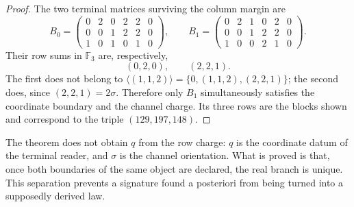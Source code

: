 \begin{proof}
The two terminal matrices surviving the column margin are
\[
B_0=
\begin{pmatrix}
0&2&0&2&2&0\\
0&0&1&2&2&0\\
1&0&1&0&1&0
\end{pmatrix},
\qquad
B_1=
\begin{pmatrix}
0&2&1&0&2&0\\
0&0&1&2&2&0\\
1&0&0&2&1&0
\end{pmatrix}.
\]
Their row sums in \(\mathbb F_3\) are, respectively,
\[
 (0,2,0),\qquad(2,2,1).
\]
The first does not belong to
\(\langle(1,1,2)\rangle=\{0,(1,1,2),(2,2,1)\}\); the second does, since
\((2,2,1)=2\sigma\). Therefore only \(B_1\) simultaneously satisfies the
coordinate boundary and the channel charge. Its three rows are the blocks
shown and correspond to the triple \((129,197,148)\).
\end{proof}

The theorem does not obtain \(q\) from the row charge: \(q\) is the
coordinate datum of the terminal reader, and \(\sigma\) is the channel orientation.
What is proved is that, once both boundaries of the same object are declared,
the real branch is unique. This separation prevents a signature found
a posteriori from being turned into a supposedly derived law.


